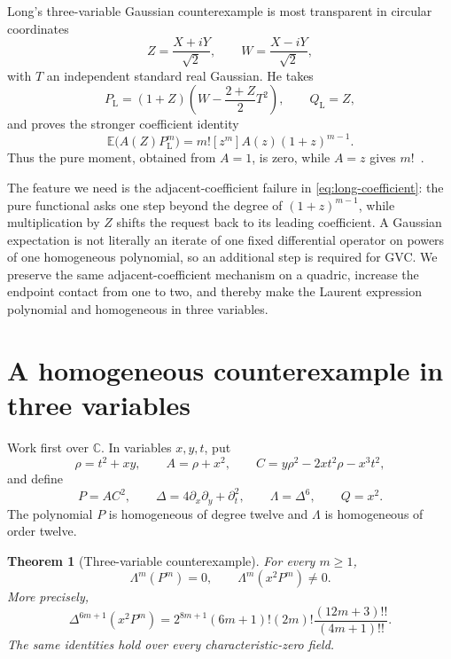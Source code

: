 \documentclass[11pt]{article}
\newtheorem{theorem}{Theorem}[section]
\begin{document}
Long's three-variable Gaussian counterexample is most transparent in
circular coordinates
\[
 Z=\frac{X+iY}{\sqrt2},\qquad
 W=\frac{X-iY}{\sqrt2},
\]
with $T$ an independent standard real Gaussian.  He takes
\begin{equation}\label{eq:long}
 P_{\mathrm L}=(1+Z)\left(W-\frac{2+Z}{2}T^2\right),
 \qquad Q_{\mathrm L}=Z,
\end{equation}
and proves the stronger coefficient identity
\begin{equation}\label{eq:long-coefficient}
 \mathbb E\bigl(A(Z)P_{\mathrm L}^m\bigr)
 =m![z^m]A(z)(1+z)^{m-1}.
\end{equation}
Thus the pure moment, obtained from $A=1$, is zero, while $A=z$ gives
$m!$~\cite{LongGMC}.

The feature we need is the adjacent-coefficient failure in
\eqref{eq:long-coefficient}: the pure functional asks one step beyond the
degree of $(1+z)^{m-1}$, while multiplication by $Z$ shifts the request
back to its leading coefficient.  A Gaussian expectation is not literally
an iterate of one fixed differential operator on powers of one homogeneous
polynomial, so an additional step is required for GVC.  We preserve the
same adjacent-coefficient mechanism on a quadric, increase the endpoint
contact from one to two, and thereby make the Laurent expression
polynomial and homogeneous in three variables.

\section{A homogeneous counterexample in three variables}

Work first over $\mathbb C$.  In variables $x,y,t$, put
\begin{equation}\label{eq:gvc3-data}
 \rho=t^2+xy,
 \qquad A=\rho+x^2,
 \qquad C=y\rho^2-2xt^2\rho-x^3t^2,
\end{equation}
and define
\begin{equation}\label{eq:gvc3-pair}
 P=AC^2,
 \qquad
 \Delta=4\partial_x\partial_y+\partial_t^2,
 \qquad
 \Lambda=\Delta^6,
 \qquad Q=x^2.
\end{equation}
The polynomial $P$ is homogeneous of degree twelve and $\Lambda$ is
homogeneous of order twelve.

\begin{theorem}[Three-variable counterexample]\label{thm:gvc3}
For every $m\geq1$,
\begin{equation}\label{eq:gvc3-pure-mixed}
 \Lambda^m(P^m)=0,
 \qquad
 \Lambda^m(x^2P^m)\ne0.
\end{equation}
More precisely,
\begin{equation}\label{eq:gvc3-exact}
 \Delta^{6m+1}(x^2P^m)
 =2^{8m+1}(6m+1)!(2m)!
   \frac{(12m+3)!!}{(4m+1)!!}.
\end{equation}
The same identities hold over every characteristic-zero field.
\end{theorem}
\end{document}
